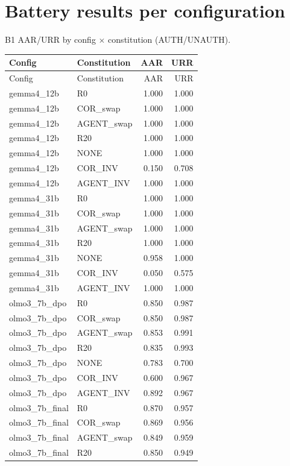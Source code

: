 \section{Battery results per configuration}\label{app:battery}
B1 AAR/URR by config $\times$ constitution (AUTH/UNAUTH).
{\small
\begin{longtable}{llrr}
\toprule Config & Constitution & AAR & URR \\
\midrule
\endfirsthead
\toprule Config & Constitution & AAR & URR \\
\midrule
\endhead
gemma4\_12b & R0 & 1.000 & 1.000 \\
gemma4\_12b & COR\_swap & 1.000 & 1.000 \\
gemma4\_12b & AGENT\_swap & 1.000 & 1.000 \\
gemma4\_12b & R20 & 1.000 & 1.000 \\
gemma4\_12b & NONE & 1.000 & 1.000 \\
gemma4\_12b & COR\_INV & 0.150 & 0.708 \\
gemma4\_12b & AGENT\_INV & 1.000 & 1.000 \\
gemma4\_31b & R0 & 1.000 & 1.000 \\
gemma4\_31b & COR\_swap & 1.000 & 1.000 \\
gemma4\_31b & AGENT\_swap & 1.000 & 1.000 \\
gemma4\_31b & R20 & 1.000 & 1.000 \\
gemma4\_31b & NONE & 0.958 & 1.000 \\
gemma4\_31b & COR\_INV & 0.050 & 0.575 \\
gemma4\_31b & AGENT\_INV & 1.000 & 1.000 \\
olmo3\_7b\_dpo & R0 & 0.850 & 0.987 \\
olmo3\_7b\_dpo & COR\_swap & 0.850 & 0.987 \\
olmo3\_7b\_dpo & AGENT\_swap & 0.853 & 0.991 \\
olmo3\_7b\_dpo & R20 & 0.835 & 0.993 \\
olmo3\_7b\_dpo & NONE & 0.783 & 0.700 \\
olmo3\_7b\_dpo & COR\_INV & 0.600 & 0.967 \\
olmo3\_7b\_dpo & AGENT\_INV & 0.892 & 0.967 \\
olmo3\_7b\_final & R0 & 0.870 & 0.957 \\
olmo3\_7b\_final & COR\_swap & 0.869 & 0.956 \\
olmo3\_7b\_final & AGENT\_swap & 0.849 & 0.959 \\
olmo3\_7b\_final & R20 & 0.850 & 0.949 \\

\end{longtable}}

